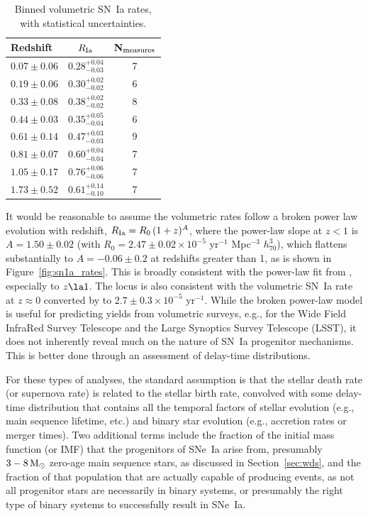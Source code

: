 \documentclass[apj]{aastex62}
\begin{document}
\begin{table}[h]
   \centering
   \caption{Binned volumetric SN~Ia rates, with statistical uncertainties.}
   \begin{tabular}{lcc} 
   \hline
   \hline
   Redshift & $R_{\rm Ia}$\tablenotemark{a}&N$_{\rm measures}$\\
   \hline
$0.07 \pm{0.06}$ & $0.28^{+0.04}_{-0.03}$& 7\\
$0.19 \pm{0.06}$ & $0.30^{+0.02}_{-0.02}$& 6\\
$0.33 \pm{0.08}$ & $0.38^{+0.02}_{-0.02}$& 8\\
$0.44 \pm{0.03}$ & $0.35^{+0.05}_{-0.04}$& 6\\
$0.61 \pm{0.14}$ & $0.47^{+0.03}_{-0.03}$& 9\\
$0.81 \pm{0.07}$ & $0.60^{+0.04}_{-0.04}$& 7\\
$1.05 \pm{0.17}$ & $0.76^{+0.06}_{-0.06}$& 7\\
$1.73 \pm{0.52}$ & $0.61^{+0.14}_{-0.10}$& 7\\
\hline
   \end{tabular}
   \label{tab:sn1a_bin}
\end{table}

It would be reasonable to assume the volumetric rates follow a broken power law evolution with redshift, $R_{\rm Ia}=R_0\,(1+z)^A$, where  the power-law slope at $z<1$ is $A=1.50\pm0.02$ (with $R_0 = 2.47\pm0.02\times10^{-5}$ yr$^{-1}$ Mpc$^{-3}$ $h_{70}^3$), which flattens substantially to $A=-0.06\pm0.2$ at redshifts greater than 1, as is shown in  Figure~\ref{fig:sn1a_rates}. This is broadly consistent with the power-law fit from \cite{Okumura:2014}, especially to $z\la1$. The locus is also consistent with the volumetric SN~Ia rate at $z\approx0$ converted by \cite{Li:2011b} to $2.7\pm0.3\times10^{-5}$ yr$^{-1}$. While the broken power-law model is useful for predicting yields from volumetric surveys, e.g., for the Wide Field InfraRed Survey Telescope \cite[\textit{WFIRST, }][]{Hounsell:2018fv} and the Large Synoptics Survey Telescope (LSST), it does not inherently reveal much on the nature of SN~Ia progenitor mechanisms. This is better done through an assessment of delay-time distributions.

For these types of analyses, the standard assumption is that the stellar death rate (or supernova rate) is related to the stellar birth rate, convolved with some delay-time distribution that contains all the temporal factors of stellar evolution (e.g., main sequence lifetime, etc.) and binary star evolution (e.g., accretion rates or merger times). Two additional terms include the fraction of the initial mass function (or IMF) that the progenitors of SNe~Ia arise from, presumably $3 - 8\, \rm{M}_{\odot}$ zero-age main sequence stars, as discussed in Section~\ref{sec:wds}, and the fraction of that population that are actually capable of producing events, as not all progenitor stars are necessarily in binary systems, or presumably the right type of binary systems to successfully result in SNe~Ia.
\end{document}
